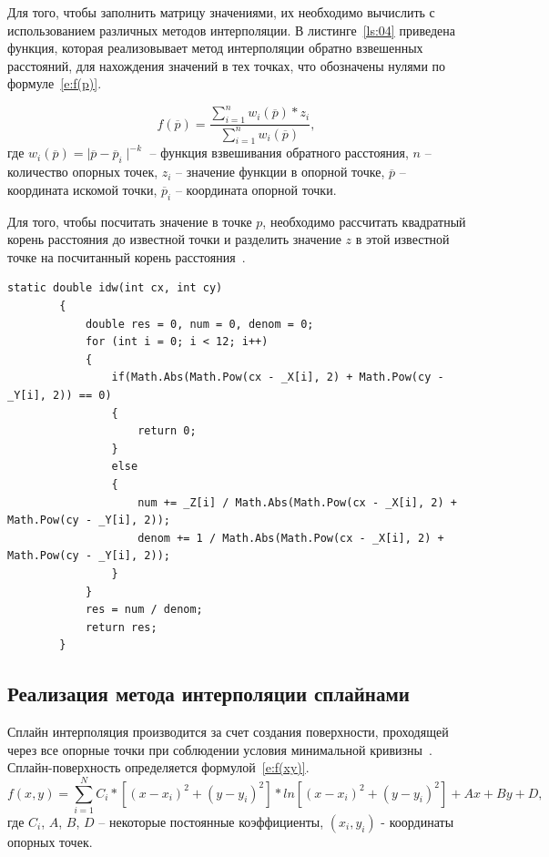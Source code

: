 Для того, чтобы заполнить матрицу значениями, их необходимо вычислить с использованием различных методов интерполяции. В листинге~\ref{ls:04} приведена функция, которая реализовывает метод интерполяции обратно взвешенных расстояний, для нахождения значений в тех точках, что обозначены нулями по формуле~\ref{e:f(p)}. 

\begin{equation} \label{e:f(p)}
f(\overline{p}) =  \frac{\sum_{i=1}^{n}{w_i(\overline{p}) * z_i}}{\sum_{i=1}^{n}{w_i(\overline{p})}},
\end{equation}
где \(w_i(\overline{p}) = \mid \overline{p}-\overline{p}_i \mid ^{-k}\) -- функция взвешивания обратного расстояния, $n$ -- количество опорных точек, $z_i$ -- значение функции в опорной точке, $\overline{p}$ -- координата искомой точки,  $\overline{p}_i$ -- координата опорной точки.

Для того, чтобы посчитать значение в точке $p$, необходимо рассчитать квадратный корень расстояния до известной точки и разделить значение $z$ в этой известной точке на посчитанный корень расстояния~\cite{25, 27}. 

\begin{lstlisting}[caption={Метод средневзвешенной интерполяции}, label={ls:04}]
static double idw(int cx, int cy)
        {
            double res = 0, num = 0, denom = 0;
            for (int i = 0; i < 12; i++)
            {
                if(Math.Abs(Math.Pow(cx - _X[i], 2) + Math.Pow(cy - _Y[i], 2)) == 0)
                {
                    return 0;
                }
                else
                {
                    num += _Z[i] / Math.Abs(Math.Pow(cx - _X[i], 2) + Math.Pow(cy - _Y[i], 2));
                    denom += 1 / Math.Abs(Math.Pow(cx - _X[i], 2) + Math.Pow(cy - _Y[i], 2));
                }
            }
            res = num / denom;
            return res;
        }
\end{lstlisting}

\subsection{Реализация метода интерполяции сплайнами}

Сплайн интерполяция производится за счет создания поверхности, проходящей через все опорные точки при соблюдении условия минимальной кривизны~\cite{24,26}. Сплайн-поверхность определяется формулой~\ref{e:f(xy)}. 
\begin{equation} \label{e:f(xy)}
f(x,y) = \sum^N_{i=1} C_i *[(x - x_i)^2 + (y - y_i)^2] * ln[(x - x_i)^2 + (y- y_i)^2] + Ax + By + D,
\end{equation}
где $C_i$, $A$, $B$, $D$ -- некоторые постоянные коэффициенты, $(x_i, y_i)$ - координаты опорных точек.

